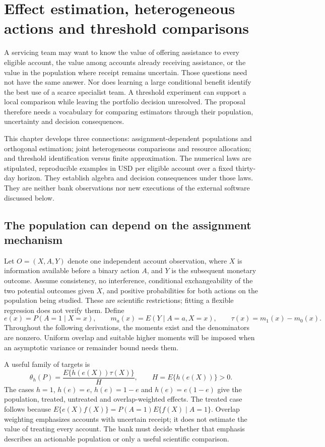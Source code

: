 \chapter{Effect estimation, heterogeneous actions and threshold comparisons}
\label{exec17:s4}

A servicing team may want to know the value of offering assistance to every
eligible account, the value among accounts already receiving assistance, or
the value in the population where receipt remains uncertain. Those questions
need not have the same answer. Nor does learning a large conditional benefit
identify the best use of a scarce specialist team. A threshold experiment can
support a local comparison while leaving the portfolio decision unresolved.
The proposal therefore needs a vocabulary for comparing estimators through
their population, uncertainty and decision consequences.

This chapter develops three connections: assignment-dependent populations and
orthogonal estimation; joint heterogeneous comparisons and resource allocation;
and threshold identification versus finite approximation. The numerical laws
are stipulated, reproducible examples in USD per eligible account over a fixed
thirty-day horizon. They establish algebra and decision consequences under
those laws. They are neither bank observations nor new executions of the
external software discussed below.~\citep{exec17_s4_math}

\section{The population can depend on the assignment mechanism}
\label{exec17:s4-target}

Let $O=(X,A,Y)$ denote one independent account observation, where $X$ is
information available before a binary action $A$, and $Y$ is the subsequent
monetary outcome. Assume consistency, no interference, conditional
exchangeability of the two potential outcomes given $X$, and positive
probabilities for both actions on the population being studied. These are
scientific restrictions; fitting a flexible regression does not verify them.
Define
\[
 e(x)=P(A=1\mid X=x),\qquad m_a(x)=E(Y\mid A=a,X=x),\qquad
 \tau(x)=m_1(x)-m_0(x).
\]
Throughout the following derivations, the moments exist and the denominators
are nonzero. Uniform overlap and suitable higher moments will be imposed when
an asymptotic variance or remainder bound needs them.

A useful family of targets is
\begin{equation}
 \theta_h(P)=\frac{E\{h(e(X))\tau(X)\}}{H},\qquad
 H=E\{h(e(X))\}>0.
 \label{exec17:s4-weight-target}
\end{equation}
The cases $h=1$, $h(e)=e$, $h(e)=1-e$ and $h(e)=e(1-e)$ give the population,
treated, untreated and overlap-weighted effects. The treated case follows
because $E\{e(X)f(X)\}=P(A=1)E\{f(X)\mid A=1\}$. Overlap weighting emphasizes
accounts with uncertain receipt; it does not estimate the value of treating
every account. The bank must decide whether that emphasis describes an
actionable population or only a useful scientific comparison.

